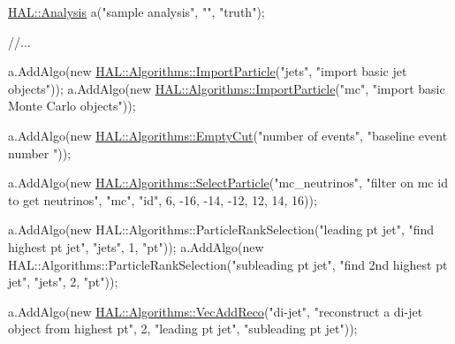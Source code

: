 \begin{DoxyCode}
\hyperlink{class_h_a_l_1_1_analysis}{HAL::Analysis} a(\textcolor{stringliteral}{"sample analysis"}, \textcolor{stringliteral}{""}, \textcolor{stringliteral}{"truth"});

\textcolor{comment}{//...}

a.AddAlgo(\textcolor{keyword}{new} \hyperlink{class_h_a_l_1_1_algorithms_1_1_import_particle}{HAL::Algorithms::ImportParticle}(\textcolor{stringliteral}{"jets"}, \textcolor{stringliteral}{"import basic jet
       objects"}));
a.AddAlgo(\textcolor{keyword}{new} \hyperlink{class_h_a_l_1_1_algorithms_1_1_import_particle}{HAL::Algorithms::ImportParticle}(\textcolor{stringliteral}{"mc"}, \textcolor{stringliteral}{"import basic Monte
       Carlo objects"}));

a.AddAlgo(\textcolor{keyword}{new} \hyperlink{class_h_a_l_1_1_algorithms_1_1_empty_cut}{HAL::Algorithms::EmptyCut}(\textcolor{stringliteral}{"number of events"}, \textcolor{stringliteral}{"baseline event number
      "}));

a.AddAlgo(\textcolor{keyword}{new} \hyperlink{class_h_a_l_1_1_algorithms_1_1_select_particle}{HAL::Algorithms::SelectParticle}(\textcolor{stringliteral}{"mc\_neutrinos"}, \textcolor{stringliteral}{"filter on mc
       id to get neutrinos"}, 
                                              \textcolor{stringliteral}{"mc"},
                                              \textcolor{stringliteral}{"id"}, 6,
                                              -16, -14, -12, 12, 14, 16));

a.AddAlgo(\textcolor{keyword}{new} HAL::Algorithms::ParticleRankSelection(\textcolor{stringliteral}{"leading pt jet"}, \textcolor{stringliteral}{"find highest pt jet"}, 
                                                     \textcolor{stringliteral}{"jets"},
                                                     1, \textcolor{stringliteral}{"pt"}));
a.AddAlgo(\textcolor{keyword}{new} HAL::Algorithms::ParticleRankSelection(\textcolor{stringliteral}{"subleading pt jet"}, \textcolor{stringliteral}{"find 2nd highest pt jet"}, 
                                                     \textcolor{stringliteral}{"jets"},
                                                     2, \textcolor{stringliteral}{"pt"}));

a.AddAlgo(\textcolor{keyword}{new} \hyperlink{class_h_a_l_1_1_algorithms_1_1_vec_add_reco}{HAL::Algorithms::VecAddReco}(\textcolor{stringliteral}{"di-jet"}, \textcolor{stringliteral}{"reconstruct a di-jet object
       from highest pt"}, 
                                          2, \textcolor{stringliteral}{"leading pt jet"}, \textcolor{stringliteral}{"subleading pt jet"}));


\end{DoxyCode}
